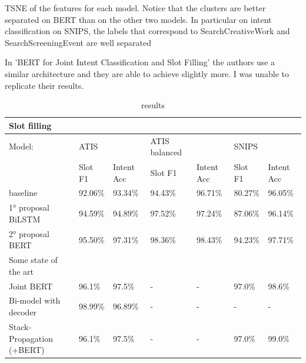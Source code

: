 \documentclass[a4paper]{article}
\begin{document}
\begin{table}[h!]
	\caption{TSNE of the features for each model. Notice that the clusters are better separated on BERT than on the other two models. In particular on intent classification on SNIPS, the labels that correspond to \textcolor{Myviolet}{SearchCreativeWork} and \textcolor{Mypurple}{SearchScreeningEvent} are well separated }
	\label{tab:embeddings}
\end{table}

In 'BERT for Joint Intent Classification and Slot Filling' \cite{https://doi.org/10.48550/arxiv.1902.10909} the authors use a similar architecture and they are able to achieve slightly more. I was unable to replicate their results.


\begin{table}[h!]
	\centering
	\begin{adjustbox}{max width=\textwidth}
		\begin{tabular}{*{7}{l}}%
			Slot filling & & &\\
			\hline
			Model: & ATIS & & ATIS balanced & & SNIPS &\\
					& Slot F1 & Intent Acc 	& Slot F1 & Intent Acc 	& Slot F1 & Intent Acc \\
			\hline
			baseline & 92.06\% & 93.34\%& 94.43\%& 96.71\%& 80.27\%& 96.05\% \\
			1° proposal BiLSTM & 94.59\%& 94.89\%& 97.52\%& 97.24\%& 87.06\% & 96.14\%\\
			2° proposal BERT& 95.50\%& 97.31\%& 98.36\%& 98.43\%& 94.23\%& 97.71\%\\
			Some state of the art & & & & & & \\
			Joint BERT \cite{https://doi.org/10.48550/arxiv.1902.10909} & 96.1\%& 97.5\%& - & - & 97.0\%& 98.6\%\\
			Bi-model with decoder\cite{wang-etal-2018-bi} & 98.99\% & 96.89\% & - & - & - & - \\
			Stack-Propagation (+BERT) \cite{qin-etal-2019-stack} & 96.1\% & 97.5\% & - & - & 97.0\% & 99.0\% \\
			\hline
		\end{tabular}
	\end{adjustbox}
		\caption{results}
	\label{tab:final_table}
\end{table}

\end{document}

